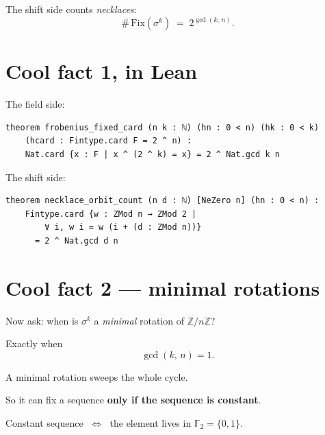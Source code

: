 \documentclass[11pt]{article}
\begin{document}
\bigskip

The shift side counts \emph{necklaces}:
\[
  \#\,\mathrm{Fix}(\sigma^{k}) \;=\; 2^{\gcd(k,\,n)} .
\]

\bigskip


\newpage


\section{Cool fact 1, in Lean}

\bigskip

The field side:

\begin{lstlisting}
theorem frobenius_fixed_card (n k : ℕ) (hn : 0 < n) (hk : 0 < k)
    (hcard : Fintype.card F = 2 ^ n) :
    Nat.card {x : F | x ^ (2 ^ k) = x} = 2 ^ Nat.gcd k n
\end{lstlisting}

\bigskip

The shift side:

\begin{lstlisting}
theorem necklace_orbit_count (n d : ℕ) [NeZero n] (hn : 0 < n) :
    Fintype.card {w : ZMod n → ZMod 2 |
        ∀ i, w i = w (i + (d : ZMod n))}
      = 2 ^ Nat.gcd d n
\end{lstlisting}

\bigskip


\newpage


\section{Cool fact 2 --- minimal rotations}

\bigskip

Now ask: when is $\sigma^{k}$ a \emph{minimal} rotation of $\mathbb{Z}/n\mathbb{Z}$?

\bigskip

Exactly when
\[
  \gcd(k,\,n) = 1 .
\]

\bigskip

A minimal rotation sweeps the whole cycle.

\bigskip

So it can fix a sequence \textbf{only if the sequence is constant}.

\bigskip

Constant sequence $\;\Longleftrightarrow\;$ the element lives in $\mathbb{F}_{2} = \{0,1\}$.
\end{document}
